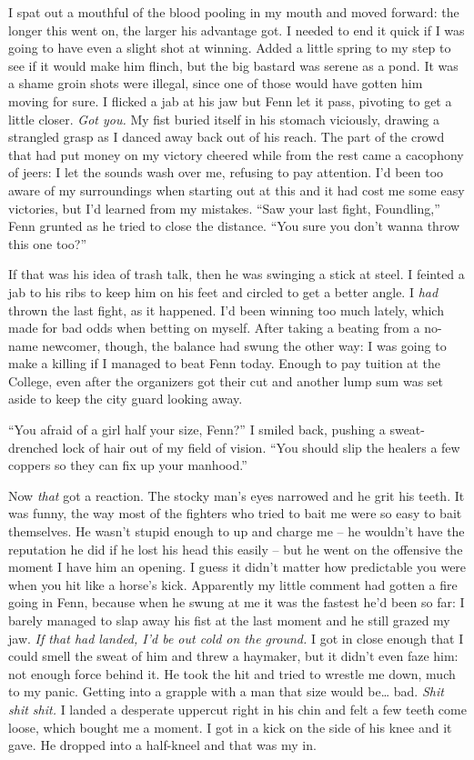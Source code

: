 \documentclass[12pt, openany]{book}
\begin{document}
I spat out a mouthful of the blood pooling in my mouth and moved forward: the longer this went on, the larger his advantage got. I needed to end it quick if I was going to have even a slight shot at winning. Added a little spring to my step to see if it would make him flinch, but the big bastard was serene as a pond. It was a shame groin shots were illegal, since one of those would have gotten him moving for sure. I flicked a jab at his jaw but Fenn let it pass, pivoting to get a little closer. \textit{Got you.} My fist buried itself in his stomach viciously, drawing a strangled grasp as I danced away back out of his reach. The part of the crowd that had put money on my victory cheered while from the rest came a cacophony of jeers: I let the sounds wash over me, refusing to pay attention. I’d been too aware of my surroundings when starting out at this and it had cost me some easy victories, but I’d learned from my mistakes. “Saw your last fight, Foundling,” Fenn grunted as he tried to close the distance. “You sure you don’t wanna throw this one too?”

If that was his idea of trash talk, then he was swinging a stick at steel. I feinted a jab to his ribs to keep him on his feet and circled to get a better angle. I \textit{had }thrown the last fight, as it happened. I’d been winning too much lately, which made for bad odds when betting on myself. After taking a beating from a no-name newcomer, though, the balance had swung the other way: I was going to make a killing if I managed to beat Fenn today. Enough to pay tuition at the College, even after the organizers got their cut and another lump sum was set aside to keep the city guard looking away.

“You afraid of a girl half your size, Fenn?” I smiled back, pushing a sweat-drenched lock of hair out of my field of vision. “You should slip the healers a few coppers so they can fix up your manhood.”

Now \textit{that} got a reaction. The stocky man’s eyes narrowed and he grit his teeth. It was funny, the way most of the fighters who tried to bait me were so easy to bait themselves. He wasn’t stupid enough to up and charge me – he wouldn’t have the reputation he did if he lost his head this easily – but he went on the offensive the moment I have him an opening. I guess it didn’t matter how predictable you were when you hit like a horse’s kick. Apparently my little comment had gotten a fire going in Fenn, because when he swung at me it was the fastest he’d been so far: I barely managed to slap away his fist at the last moment and he still grazed my jaw. \textit{If that had landed, I’d be out cold on the ground.} I got in close enough that I could smell the sweat of him and threw a haymaker, but it didn’t even faze him: not enough force behind it. He took the hit and tried to wrestle me down, much to my panic. Getting into a grapple with a man that size would be… bad. \textit{Shit shit shit.} I landed a desperate uppercut right in his chin and felt a few teeth come loose, which bought me a moment. I got in a kick on the side of his knee and it gave. He dropped into a half-kneel and that was my in.
\end{document}

